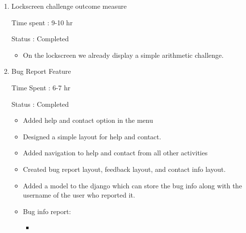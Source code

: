 \documentclass{article}
\begin{document}
\begin{enumerate}
    \item Lockscreen challenge outcome measure
    
    Time spent : 9-10 hr

    Status : Completed
    \begin{itemize}
        \item On the lockscreen we already display a simple arithmetic challenge.
    \end{itemize}

    \item Bug Report Feature
    
    Time Spent : 6-7 hr

    Status : Completed

    \begin{itemize}
        \item Added help and contact option in the menu
        \item Designed a simple layout for help and contact.
        \item Added navigation to help and contact from all other activities
        \item Created bug report layout, feedback layout, and contact info layout.
        \item Added a model to the django which can store the bug info along with the username of the user who reported it.
        \item Bug info report:
        \begin{itemize}
            \item 
        \end{itemize}
    \end{itemize}

\end{enumerate}
\end{document}
